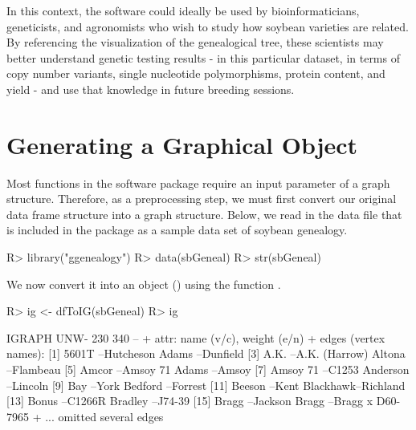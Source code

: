 \documentclass[article,shortnames]{jss}
\begin{document}
In this context, the software could ideally be used by bioinformaticians, geneticists, and agronomists who wish to study how soybean varieties are related. By referencing the visualization of the genealogical tree, these scientists may better understand genetic testing results - in this particular dataset, in terms of copy number variants, single nucleotide polymorphisms, protein content, and yield - and use that knowledge in future breeding sessions.

\section{Generating a Graphical Object}

Most functions in the software package require an input parameter of a graph structure. Therefore, as a preprocessing step, we must first convert our original data frame structure into a graph structure. Below, we read in the  data file  that is included in the package as a sample data set of soybean genealogy.

\begin{CodeChunk}
\begin{CodeInput}
R> library("ggenealogy")
R> data(sbGeneal)
R> str(sbGeneal)
\end{CodeInput}
\end{CodeChunk}

We now convert it into an  object (\citealt{igraph})  using the function .

\begin{CodeChunk}
\begin{CodeInput}
R> ig <- dfToIG(sbGeneal)
R> ig
\end{CodeInput}
\begin{CodeOutput}
IGRAPH UNW- 230 340 -- 
+ attr: name (v/c), weight (e/n)
+ edges (vertex names):
 [1] 5601T    --Hutcheson        Adams    --Dunfield        
 [3] A.K.     --A.K. (Harrow)    Altona   --Flambeau        
 [5] Amcor    --Amsoy 71         Adams    --Amsoy           
 [7] Amsoy 71 --C1253            Anderson --Lincoln         
 [9] Bay      --York             Bedford  --Forrest         
[11] Beeson   --Kent             Blackhawk--Richland        
[13] Bonus    --C1266R           Bradley  --J74-39          
[15] Bragg    --Jackson          Bragg    --Bragg x D60-7965
+ ... omitted several edges
\end{CodeOutput}
\end{CodeChunk}
\end{document}

